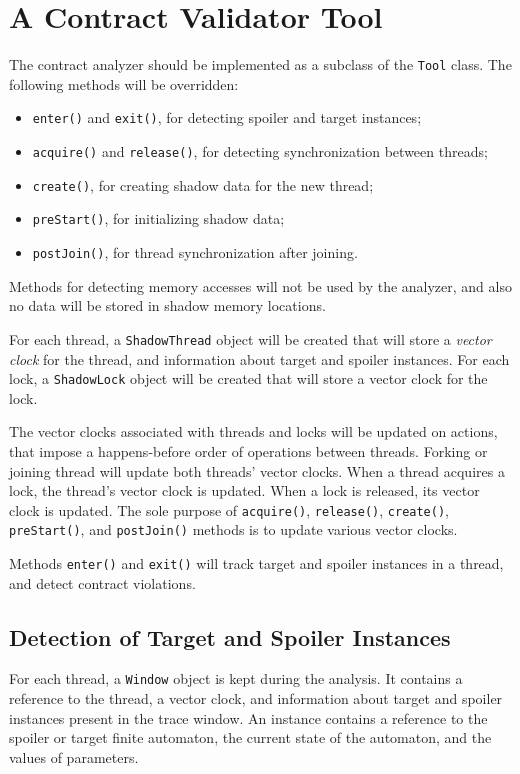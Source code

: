 \section{A Contract Validator Tool}

The contract analyzer should be implemented as a subclass of the \texttt{Tool}
class. The following methods will be overridden:
\begin{itemize}
    \item \texttt{enter()} and \texttt{exit()}, for detecting spoiler and target
        instances;
    \item \texttt{acquire()} and \texttt{release()}, for detecting
        synchronization between threads;
    \item \texttt{create()}, for creating shadow data for the new thread;
    \item \texttt{preStart()}, for initializing shadow data;
    \item \texttt{postJoin()}, for thread synchronization after joining.
\end{itemize}

Methods for detecting memory accesses will not be used by the analyzer, and also
no data will be stored in shadow memory locations.

For each thread, a \texttt{ShadowThread} object will be created that will store
a \emph{vector clock} for the thread, and information about target and spoiler
instances. For each lock, a \texttt{ShadowLock} object will be created that will
store a vector clock for the lock.

The vector clocks associated with threads and locks will be updated on actions,
that impose a happens-before order of operations between threads. Forking or
joining thread will update both threads' vector clocks. When a thread acquires a
lock, the thread's vector clock is updated. When a lock is released, its vector
clock is updated. The sole purpose of \texttt{acquire()}, \texttt{release()},
\texttt{create()}, \texttt{preStart()}, and \texttt{postJoin()} methods is to
update various vector clocks.

Methods \texttt{enter()} and \texttt{exit()} will track target and spoiler
instances in a thread, and detect contract violations.

\subsection{Detection of Target and Spoiler Instances}

For each thread, a \texttt{Window} object is kept during the analysis. It
contains a reference to the thread, a vector clock, and information about target
and spoiler instances present in the trace window. An instance contains a
reference to the spoiler or target finite automaton, the current state of the
automaton, and the values of parameters.

